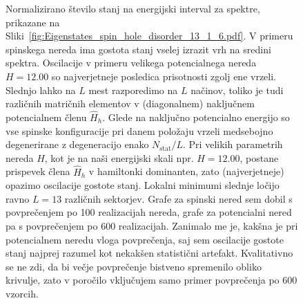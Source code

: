 \documentclass[10pt,a4paper]{article}
\begin{document}
 \begin{figure}[H]
\caption{Normalizirano število stanj na energijski interval za spektre, prikazane na Sliki~\ref{fig:Eigenstates_spin_hole_disorder_13_1_6.pdf}. V primeru spinskega nereda ima gostota stanj vselej izrazit vrh na sredini spektra. Oscilacije v primeru velikega potencialnega nereda $H=12.00$ so najverjetneje posledica prisotnosti zgolj ene vrzeli. Slednjo lahko na $L$ mest razporedimo na $L$ načinov, toliko je tudi različnih matričnih elementov v (diagonalnem) naključnem potencialnem členu $\hat{H}_h$. Glede na naključno potencialno energijo so vse spinske konfiguracije pri danem položaju vrzeli medsebojno degenerirane z degeneracijo enako $N_\mathrm{stat}/L$. Pri velikih parametrih nereda $H$, kot je na naši energijski skali npr. $H=12.00$, postane prispevek člena $\hat{H}_h$ v hamiltonki dominanten, zato (najverjetneje) opazimo oscilacije gostote stanj. Lokalni minimumi slednje ločijo ravno $L=13$ različnih sektorjev. Grafe za spinski nered sem dobil s povprečenjem po 100 realizacijah nereda, grafe za potencialni nered pa s povprečenjem po 600 realizacijah. Zanimalo me je, kakšna je pri potencialnem neredu vloga povprečenja, saj sem oscilacije gostote stanj najprej razumel kot nekakšen statistični artefakt. Kvalitativno se ne zdi, da bi večje povprečenje bistveno spremenilo obliko krivulje, zato v poročilo vključujem samo primer povprečenja po 600 vzorcih.}
\label{fig:DOS_spin_hole_disorder_13_1_6.pdf}
\end{figure}
\end{document}
